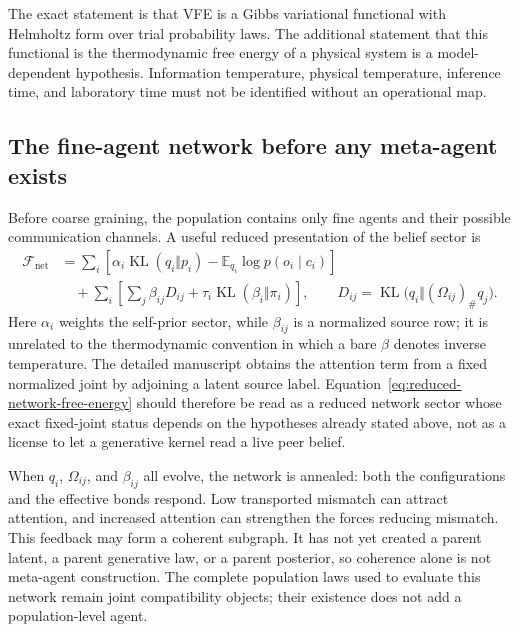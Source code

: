 \documentclass[11pt,letterpaper]{article}
\newcommand{\KL}{\operatorname{KL}}
\newcommand{\Ex}{\mathbb E}
\begin{document}
\begin{physicalreading}
The exact statement is that VFE is a Gibbs variational functional with Helmholtz form over trial probability laws. The additional statement that this functional is the thermodynamic free energy of a physical system is a model-dependent hypothesis. Information temperature, physical temperature, inference time, and laboratory time must not be identified without an operational map.
\end{physicalreading}

\subsection{The fine-agent network before any meta-agent exists}

Before coarse graining, the population contains only fine agents and their possible communication channels. A useful reduced presentation of the belief sector is
\begin{align}
  \mathcal F_{\mathrm{net}}
  &=\sum_i\left[
    \alpha_i\KL(q_i\Vert p_i)
    -\Ex_{q_i}\log p(o_i\mid c_i)
  \right]
  \nonumber\\
  &\quad+\sum_i\left[
    \sum_j\beta_{ij}D_{ij}
    +\tau_i\KL(\beta_i\Vert\pi_i)
  \right],
  \qquad
  D_{ij}=\KL\bigl(q_i\Vert(\Omega_{ij})_{\#}q_j\bigr).
  \label{eq:reduced-network-free-energy}
\end{align}
Here \(\alpha_i\) weights the self-prior sector, while \(\beta_{ij}\) is a normalized source row; it is unrelated to the thermodynamic convention in which a bare \(\beta\) denotes inverse temperature. The detailed manuscript obtains the attention term from a fixed normalized joint by adjoining a latent source label. Equation~\eqref{eq:reduced-network-free-energy} should therefore be read as a reduced network sector whose exact fixed-joint status depends on the hypotheses already stated above, not as a license to let a generative kernel read a live peer belief.

When \(q_i\), \(\Omega_{ij}\), and \(\beta_{ij}\) all evolve, the network is annealed: both the configurations and the effective bonds respond. Low transported mismatch can attract attention, and increased attention can strengthen the forces reducing mismatch. This feedback may form a coherent subgraph. It has not yet created a parent latent, a parent generative law, or a parent posterior, so coherence alone is not meta-agent construction. The complete population laws used to evaluate this network remain joint compatibility objects; their existence does not add a population-level agent.
\end{document}
